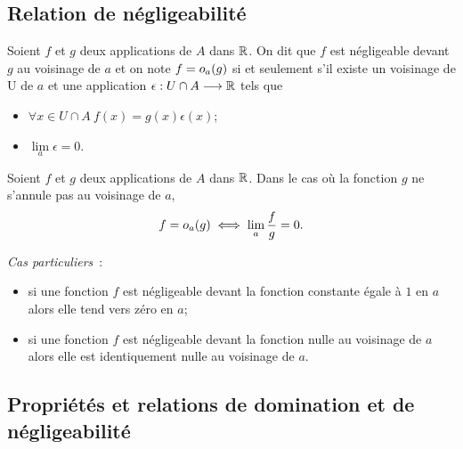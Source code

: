 \subsection{Relation de négligeabilité}

\begin{defdef}
  Soient \(f\) et \(g\) deux applications de \(A\) dans \(\mathbb{R}\). On dit que \(f\)
  est négligeable devant \(g\) au voisinage de \(a\) et on note
  \(f=o\mathopen{}_{a}\left(g\right)\) si et seulement s'il existe un voisinage de U de \(a\) et
  une application \(\epsilon : U\cap A \longrightarrow \mathbb{R}\) tels que
  \begin{itemize}
    \item \(\forall x \in U \cap A \ f(x)=g(x)\epsilon(x)\);
    \item \(\lim\limits_{a} \epsilon =0\).
  \end{itemize}
\end{defdef}
\begin{prop}
  Soient \(f\) et \(g\) deux applications de \(A\) dans \(\mathbb{R}\). Dans le cas où
  la fonction \(g\) ne s'annule pas au voisinage de \(a\),
  \begin{equation}
    f=o\mathopen{}_{a}\left(g\right) \iff \lim\limits_{a} \frac{f}{g}=0.
  \end{equation}
\end{prop}

\emph{Cas particuliers}~:
\begin{itemize}
  \item si une fonction \(f\) est négligeable devant la fonction constante égale
    à \(1\) en \(a\) alors elle tend vers zéro en \(a\);
  \item si une fonction \(f\) est négligeable devant la fonction nulle au
    voisinage de \(a\) alors elle est identiquement nulle au voisinage de \(a\).
\end{itemize}

\subsection{Propriétés et relations de domination et de négligeabilité}

